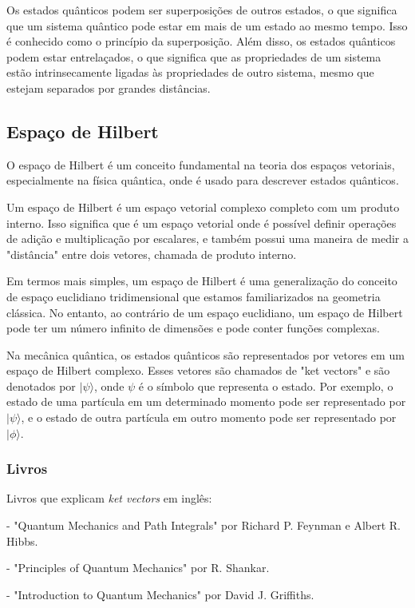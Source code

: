 \documentclass[12pt]{article}
\begin{document}
Os estados quânticos podem ser superposições de outros estados, o que significa que um sistema quântico pode estar em mais de um estado ao mesmo tempo. Isso é conhecido como o princípio da superposição. Além disso, os estados quânticos podem estar entrelaçados, o que significa que as propriedades de um sistema estão intrinsecamente ligadas às propriedades de outro sistema, mesmo que estejam separados por grandes distâncias.

\subsection{Espaço de Hilbert}


O espaço de Hilbert é um conceito fundamental na teoria dos espaços vetoriais, especialmente na física quântica, onde é usado para descrever estados quânticos.

Um espaço de Hilbert é um espaço vetorial complexo completo com um produto interno. Isso significa que é um espaço vetorial onde é possível definir operações de adição e multiplicação por escalares, e também possui uma maneira de medir a "distância" entre dois vetores, chamada de produto interno.

Em termos mais simples, um espaço de Hilbert é uma generalização do conceito de espaço euclidiano tridimensional que estamos familiarizados na geometria clássica. No entanto, ao contrário de um espaço euclidiano, um espaço de Hilbert pode ter um número infinito de dimensões e pode conter funções complexas.

Na mecânica quântica, os estados quânticos são representados por vetores em um espaço de Hilbert complexo. Esses vetores são chamados de "ket vectors" e são denotados por $|\psi\rangle$, onde $\psi$ é o símbolo que representa o estado. Por exemplo, o estado de uma partícula em um determinado momento pode ser representado por $|\psi\rangle$, e o estado de outra partícula em outro momento pode ser representado por $|\phi\rangle$.

\subsubsection{Livros}

Livros que explicam \textit{ket vectors} em inglês:

- "Quantum Mechanics and Path Integrals" por Richard P. Feynman e Albert R. Hibbs.

- "Principles of Quantum Mechanics" por R. Shankar.

- "Introduction to Quantum Mechanics" por David J. Griffiths.
\end{document}
